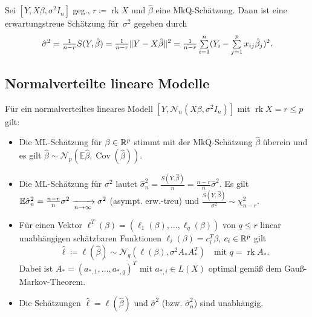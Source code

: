 \documentclass{cheat-sheet}
\newcommand{\E}{\mathbb{E}} %
\DeclareMathOperator{\rk}{rk} %
\DeclareMathOperator{\cov}{Cov} %
\newcommand{\Normal}{\mathcal{N}} %
\begin{document}
\begin{samepage}

\begin{satz}
  Sei $[Y, X \beta, \sigma^2 I_n]$ geg., $r \coloneqq \rk X$ und $\hat{\beta}$ eine MkQ-Schätzung.
  Dann ist eine erwartungstreue Schätzung für~$\sigma^2$ gegeben durch
  \[
    \hat{\sigma}^2
    = \tfrac{1}{n-r} S(Y, \hat{\beta})
    = \tfrac{1}{n-r} \norm{Y - X \hat\beta}^2
    = \tfrac{1}{n-r} \sum_{i=1}^n (Y_i - \sum_{j=1}^p x_{ij} \hat\beta_j)^2.
  \]
\end{satz}


\subsection{Normalverteilte lineare Modelle}

\end{samepage}

\begin{satz}
  Für ein normalverteiltes lineares Modell $[Y, \Normal_n(X \beta, \sigma^2 I_n)]$ mit $\rk X = r \leq p$ gilt:
  \begin{itemize}
    \item Die ML-Schätzung für $\beta \in \mathbb{R}^p$ stimmt mit der MkQ-Schätzung $\hat\beta$ überein und es gilt $\hat\beta \sim \Normal_p(\E \hat\beta, \cov(\hat{\beta}))$.
    \item Die ML-Schätzung für $\sigma^2$ lautet $\hat\sigma_n^2 = \tfrac{S(Y, \hat{\beta})}{n} = \tfrac{n-r}{n} \hat\sigma^2$.
    Es gilt $\E \hat\sigma_n^2 = \tfrac{n-r}{n} \sigma^2 \xra[n \to \infty]{} \sigma^2$ (asympt. erw.-treu) und $\tfrac{S(Y, \hat\beta)}{\sigma^2} \sim \chi_{n-r}^2$.
    \item Für einen Vektor $\ell^T(\beta) = (\ell_1(\beta), \ldots, \ell_q(\beta))$ von $q \leq r$ linear unabhängigen schätzbaren Funktionen $\ell_i(\beta) = c_i^T \beta$, $c_i \in \mathbb{R}^p$
    gilt
    \[
      \hat{\ell} \coloneqq \ell(\hat{\beta}) \sim \Normal_q(\ell(\beta), \sigma^2 A_* A_*^T) \quad
      \text{mit } q = \rk A_*.
    \]
    Dabei ist $A_* = (a_{*,1}, \ldots, a_{*,q})^T$ mit $a_{*,i} \in L(X)$ optimal gemäß dem Gauß-Markov-Theorem.
    \item Die Schätzungen $\hat{\ell} = \ell(\hat\beta)$ und $\hat\sigma^2$ (bzw. $\hat\sigma_n^2$) sind unabhängig.
  \end{itemize}
\end{satz}
\end{document}
